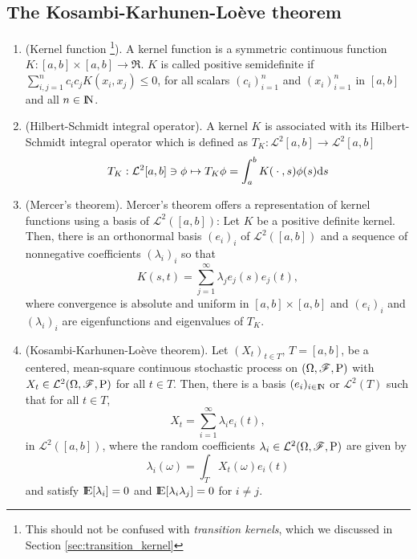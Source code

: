 \documentclass[a4paper,10pt]{article}
\begin{document}
\subsection{The Kosambi-Karhunen-Lo{\`e}ve theorem}
\begin{enumerate}
 \item (Kernel function%
      \footnote{This should not be confused with \textit{transition kernels}, 
                which we discussed in Section \ref{sec:transition_kernel}}).  
       A kernel function is a symmetric continuous function \(K: [a,b] \times [a,b] \to \Re\).
       \(K\) is called positive semidefinite if \(\sum_{i,j=1}^{n} c_i c_j K(x_i,x_j) \leq 0\),
       for all scalars \((c_i)_{i=1}^{n}\) and \((x_i)_{i=1}^{n}\) in \([a,b]\) and all
       \(n\in\N\).
 \item (Hilbert-Schmidt integral operator). A kernel \(K\) is associated with its
       Hilbert-Schmidt integral operator which is defined as \(T_K: \mathcal{L}^2[a,b]\to\mathcal{L}^2[a,b]\)
       \[
        T_K : \mathcal{L}^2[a,b] \ni \phi \mapsto T_K \phi = \int_{a}^{b}K({}\cdot{},s)\phi(s)\mathrm{d} s
       \]
 \item (Mercer's theorem). Mercer's theorem offers a representation of kernel functions 
       using a basis of \(\mathcal{L}^2([a,b])\): Let \(K\) be a positive definite kernel.
       Then, there is an orthonormal basis \((e_i)_{i}\) of $\mathcal{L}^2([a,b])$ and 
       a sequence of nonnegative coefficients \((\lambda_i)_i\) so that 
       \[
        K(s,t) = \sum_{j=1}^{\infty} \lambda_j e_j(s)e_j(t),
       \]
       where convergence is absolute and uniform in \([a,b]\times [a,b]\) and 
       \((e_i)_i\) and \((\lambda_i)_i\) are eigenfunctions and eigenvalues of \(T_K\).
  
 
 \item (Kosambi-Karhunen-Lo{\`e}ve theorem).  Let \((X_t)_{t\in T}\), \(T=[a,b]\), be a 
       centered, mean-square continuous stochastic process on \((\Omega,\mathscr{F},\mathrm{P})\) with \(X_t\in\mathcal{L}^2(\Omega,\mathscr{F},\mathrm{P})\)
       for all \(t\in T\).
       Then, there is a basis \((e_i)_{i\in\N}\) or \(\mathcal{L}^2(T)\) such that for all 
       \(t\in T\),
       \[
         X_t = \sum_{i=1}^{\infty}\lambda_i e_i(t),
       \]
       in \(\mathcal{L}^2([a,b])\), where the random coefficients \(\lambda_i\in\mathcal{L}^2(\Omega,\mathscr{F},\mathrm{P})\) are given by
       \[
        \lambda_i(\omega) = \int_{T}X_t(\omega)e_i(t)
       \]
       and satisfy \(\E[\lambda_i]=0\) and \(\E[\lambda_i \lambda_j] = 0\) for \(i\neq j\).
       

\end{enumerate}
\end{document}
